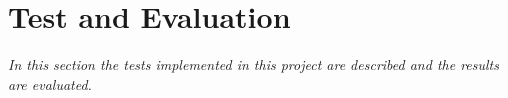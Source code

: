 \chapter{Test and Evaluation}
\label{cha:test}
\textit{In this section the tests implemented in this project are described and the results are evaluated.}
\newpage




